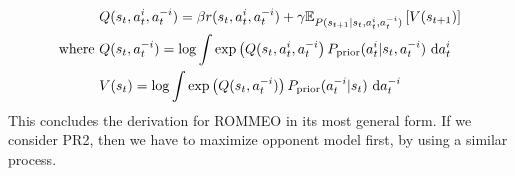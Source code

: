 \begin{equation}
    \label{eqn:chap3-final-ROMMEO}
    \begin{aligned}
        &Q(s_t, a^i_t, a^{-i}_t) = \beta r(s_t, a^i_t, a^{-i}_t) + \gamma\mathbb{E}_{P(s_{t+1} | s_t, a^i_t, a^{-i}_t)} \left[ V(s_{t+1}) \right] \\
        \text{where }&Q(s_t, a^{-i}_t) = \log \int \exp \left( Q(s_t, a^i_t, a^{-i}_t \right)P_{\text{prior}}(a^i_t | s_t, a^{-i}_t)  \ \mathrm{d} a^i_t \\ 
        &V(s_t) = \log \int \exp\left( Q(s_t, a^{-i}_t) \right)P_{\text{prior}}(a^{-i}_t | s_t) \ \mathrm{d} a^{-i}_t \\
    \end{aligned}
\end{equation}    
This concludes the derivation for ROMMEO in its most general form. If we consider PR2, then we have to maximize opponent model first, by using a similar process.

